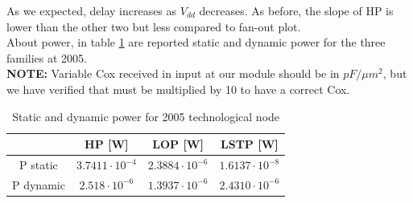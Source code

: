 As we expected, delay increases as $V_{dd}$ decreases. As before, the slope of HP is lower than the other two but less compared to fan-out plot. \\About power, in table \ref{tab:power} are reported static and dynamic power for the three families at 2005.
\vspace{2cm}
\\
\textbf{NOTE:} Variable Cox received in input at our module should be in $pF/\mu m^2$, but we have verified that must be multiplied by 10 to have a correct Cox.
\begin{table}[htdp]
\begin{center}
\begin{tabular}{|c|c|c|c|}
\hline
 & HP [W] & LOP [W] & LSTP [W]\\
\hline
P static & $3.7411\cdotp 10^{-4}$ & $2.3884\cdotp 10^{-6}$ & $1.6137\cdotp 10^{-8}$\\
\hline
P dynamic & $2.518\cdotp 10^{-6}$ & $1.3937\cdotp 10^{-6}$ & $2.4310\cdotp 10^{-6}$\\
\hline
\end{tabular}
\end{center}
\caption{Static and dynamic power for 2005 technological node}
\label{tab:power}
\end{table}